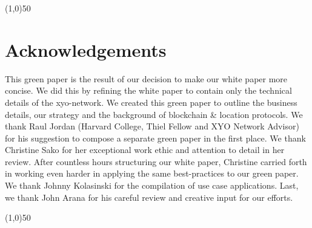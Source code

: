 \documentclass{article}
\begin{document}
\begin{center}
\line(1,0){50}
\end{center}

\section {Acknowledgements}
This green paper is the result of our decision to make our white paper more concise. We did this by refining the white paper to contain only the technical details of the \Gls{xyo-network}. We created this green paper to outline the business details, our strategy and the background of blockchain \& location protocols. We thank Raul Jordan (Harvard College, Thiel Fellow and XYO Network Advisor) for his suggestion to compose a separate green paper in the first place. We thank Christine Sako for her exceptional work ethic and attention to detail in her review. After countless hours structuring our white paper, Christine carried forth in working even harder in applying the same best-practices to our green paper. We thank Johnny Kolasinski for the compilation of use case applications. Last, we thank John Arana for his careful review and creative input for our efforts.


\begin{center}
\line(1,0){50}
\end{center}
\end{document}

